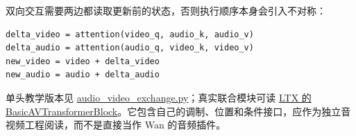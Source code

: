 双向交互需要两边都读取更新前的状态，否则执行顺序本身会引入不对称：

\begin{verbatim}
delta_video = attention(video_q, audio_k, audio_v)
delta_audio = attention(audio_q, video_k, video_v)
new_video = video + delta_video
new_audio = audio + delta_audio
\end{verbatim}

单头教学版本见 \hyperref[code-audio-video-exchange]{audio\_video\_exchange.py}；真实联合模块可读 \href{https://github.com/Lightricks/LTX-2/blob/daa6b16fc7f0f1628f2c9e36a303e3312b333cc6/packages/ltx-core/src/ltx_core/model/transformer/transformer.py}{LTX 的 BasicAVTransformerBlock}。它包含自己的调制、位置和条件接口，应作为独立音视频工程阅读，而不是直接当作 Wan 的音频插件。
